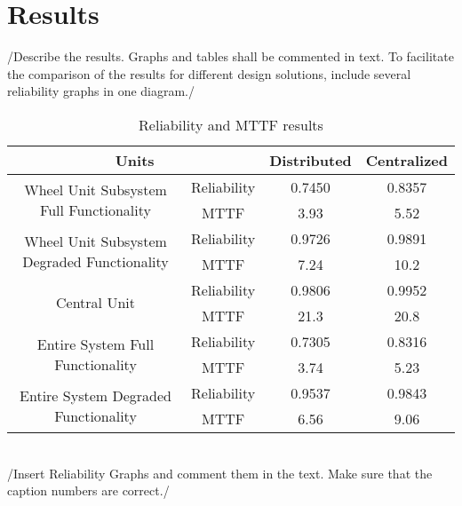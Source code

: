 \newpage
\section{Results}
\label{S4}
/{Describe the results. Graphs and tables shall be commented in text. To facilitate the comparison of the results for different design solutions, include several reliability graphs in one diagram.}/
\begin{table}[h]
\centering
\begin{tabular}{| c | c | c | c |}
\hline
\multicolumn{2}{|c|}{Units} & Distributed & Centralized\\
\hline
\multirow{2}{*}{Wheel Unit Subsystem Full Functionality} & Reliability & 0.7450 & 0.8357\\
 & MTTF & 3.93  & 5.52\\
\hline
\multirow{2}{*}{Wheel Unit Subsystem Degraded Functionality}& Reliability & 0.9726  & 0.9891\\
 & MTTF & 7.24 & 10.2\\
\hline
\multirow{2}{*}{Central Unit}& Reliability& 0.9806  & 0.9952\\
 & MTTF & 21.3  & 20.8\\
\hline
\multirow{2}{*}{Entire System Full Functionality}& Reliability & 0.7305  & 0.8316\\
 & MTTF & 3.74 & 5.23\\
\hline
\multirow{2}{*}{Entire System Degraded Functionality}& Reliability & 0.9537 & 0.9843\\
 & MTTF & 6.56 & 9.06\\
\hline
\end{tabular}
\caption{Reliability and MTTF results}
\label{tab:Put a Lable}
\end{table}
\\/{Insert Reliability Graphs and comment them in the text. Make sure that the caption numbers are correct.}/